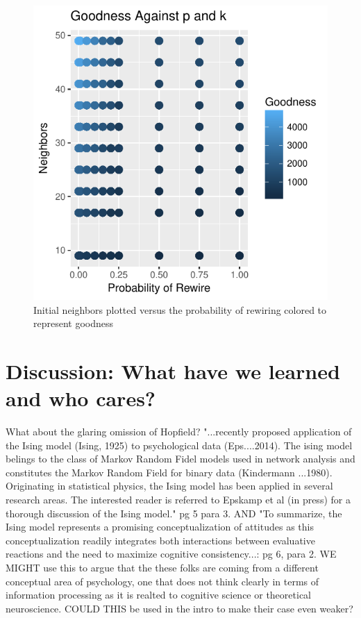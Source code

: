 \documentclass{article}
\begin{document}
\begin{figure}
\centering
\includegraphics[width=1\textwidth]{7-k_vs_p_G_col.pdf}
\caption{\label{fig:pkg}Initial neighbors plotted versus the probability of rewiring colored to represent goodness}
\end{figure}



\section{Discussion:  What have we learned and who cares?}
\label{sec:disc}
What about the glaring omission of Hopfield?  "...recently proposed application of the Ising model (Ising, 1925) to psychological data (Eps....2014). The ising model belings to the class of Markov Random Fidel models used in network analysis and constitutes the Markov Random Field for binary data (Kindermann ...1980).  Originating in statistical physics, the Ising model has been applied in several research areas.  The interested reader is referred to Epskamp et al (in press) for a thorough discussion of the Ising model." pg 5 para 3. AND "To summarize, the Ising model represents a promising conceptualization of attitudes as this conceptualization readily integrates both interactions between evaluative reactions and the need to maximize cognitive consistency...: pg 6, para 2.  WE MIGHT use this to argue that the these folks are coming from a different conceptual area of psychology, one that does not think clearly in terms of information processing as it is realted to cognitive science or theoretical neuroscience.  COULD THIS be used in the intro to make their case even weaker?
\end{document}
